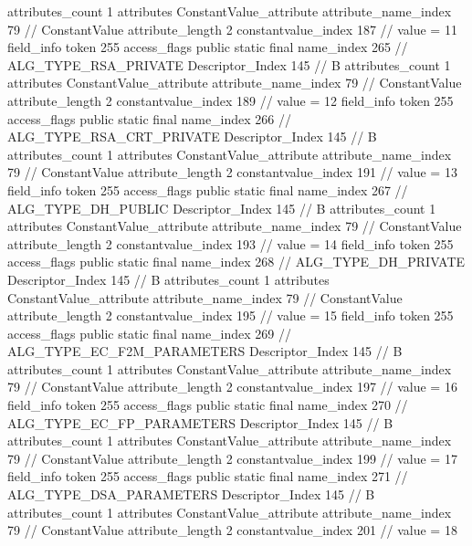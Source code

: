 {{{{{				attributes_count	1
				attributes {
				ConstantValue_attribute {
					attribute_name_index	79		// ConstantValue
					attribute_length	2
					constantvalue_index	187		// value = 11
				}
				}
			}
			field_info {
				token	255
				access_flags	public static final
				name_index	265		// ALG_TYPE_RSA_PRIVATE
				Descriptor_Index	145		// B
				attributes_count	1
				attributes {
				ConstantValue_attribute {
					attribute_name_index	79		// ConstantValue
					attribute_length	2
					constantvalue_index	189		// value = 12
				}
				}
			}
			field_info {
				token	255
				access_flags	public static final
				name_index	266		// ALG_TYPE_RSA_CRT_PRIVATE
				Descriptor_Index	145		// B
				attributes_count	1
				attributes {
				ConstantValue_attribute {
					attribute_name_index	79		// ConstantValue
					attribute_length	2
					constantvalue_index	191		// value = 13
				}
				}
			}
			field_info {
				token	255
				access_flags	public static final
				name_index	267		// ALG_TYPE_DH_PUBLIC
				Descriptor_Index	145		// B
				attributes_count	1
				attributes {
				ConstantValue_attribute {
					attribute_name_index	79		// ConstantValue
					attribute_length	2
					constantvalue_index	193		// value = 14
				}
				}
			}
			field_info {
				token	255
				access_flags	public static final
				name_index	268		// ALG_TYPE_DH_PRIVATE
				Descriptor_Index	145		// B
				attributes_count	1
				attributes {
				ConstantValue_attribute {
					attribute_name_index	79		// ConstantValue
					attribute_length	2
					constantvalue_index	195		// value = 15
				}
				}
			}
			field_info {
				token	255
				access_flags	public static final
				name_index	269		// ALG_TYPE_EC_F2M_PARAMETERS
				Descriptor_Index	145		// B
				attributes_count	1
				attributes {
				ConstantValue_attribute {
					attribute_name_index	79		// ConstantValue
					attribute_length	2
					constantvalue_index	197		// value = 16
				}
				}
			}
			field_info {
				token	255
				access_flags	public static final
				name_index	270		// ALG_TYPE_EC_FP_PARAMETERS
				Descriptor_Index	145		// B
				attributes_count	1
				attributes {
				ConstantValue_attribute {
					attribute_name_index	79		// ConstantValue
					attribute_length	2
					constantvalue_index	199		// value = 17
				}
				}
			}
			field_info {
				token	255
				access_flags	public static final
				name_index	271		// ALG_TYPE_DSA_PARAMETERS
				Descriptor_Index	145		// B
				attributes_count	1
				attributes {
				ConstantValue_attribute {
					attribute_name_index	79		// ConstantValue
					attribute_length	2
					constantvalue_index	201		// value = 18
}}}}}}}
